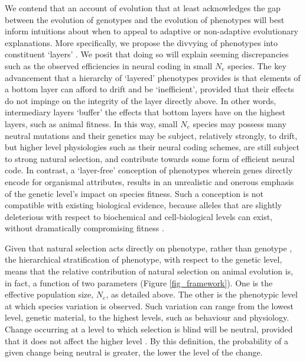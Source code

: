 \documentclass[twocolumn]{article}
\begin{document}
We contend that an account of evolution that at least acknowledges the gap between the evolution of genotypes and the evolution of phenotypes will best inform intuitions about when to appeal to adaptive or non-adaptive evolutionary explanations. More specifically, we propose the divvying of phenotypes into constituent `layers' \cite{Ho_Ohya_Zhang_2017, mayr_1997, wideman_doolittle_2019, Zhang_2018}. We posit that doing so will explain seeming discrepancies such as the observed efficiencies in neural coding in small $N_e$ species. The key advancement that a hierarchy of `layered' phenotypes provides is that elements of a bottom layer can afford to drift and be `inefficient', provided that their effects do not impinge on the integrity of the layer directly above. In other words, intermediary layers `buffer' the effects that bottom layers have on the highest layers, such as animal fitness. In this way, small $N_e$ species may possess many neutral mutations and their genetics may be subject, relatively strongly, to drift, but higher level physiologies such as their neural coding schemes, are still subject to strong natural selection, and contribute towards some form of efficient neural code. In contrast, a `layer-free' conception of phenotypes wherein genes directly encode for organismal attributes, results in an unrealistic and onerous emphasis of the genetic level's impact on species fitness. Such a conception is not compatible with existing biological evidence, because alleles that are slightly deleterious with respect to biochemical and cell-biological levels can exist, without dramatically compromising fitness \cite{wideman_doolittle_2019}. 

Given that natural selection acts directly on phenotype, rather than genotype \cite{mayr_1997}, the hierarchical stratification of phenotype, with respect to the genetic level, means that the relative contribution of natural selection on animal evolution is, in fact, a function of two parameters (Figure \ref{fig_framework}). One is the effective population size, $N_e$, as detailed above. The other is the phenotypic level at which species variation is observed. Such variation can range from the lowest level, genetic material, to the highest levels, such as behaviour and physiology. Change occurring at a level to which selection is blind will be neutral, provided that it does not affect the higher level \cite{mayr_1997, wideman_doolittle_2019, Zhang_2018}. By this definition, the probability of a given change being neutral is greater, the lower the level of the change. 
\end{document}
